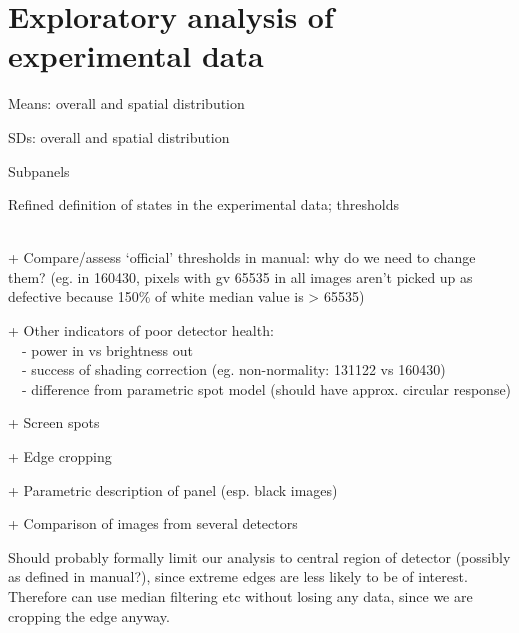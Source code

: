 \documentclass[\main/IO-Pixels.tex]{subfiles}
\begin{document}
\section{Exploratory analysis of experimental data}
\begin{outline}
Means: overall and spatial distribution

SDs: overall and spatial distribution

Subpanels

Refined definition of states in the experimental data; thresholds

\\
+ Compare/assess `official' thresholds in manual: why do we need to change them? (eg. in 160430, pixels with gv 65535 in all images aren't picked up as defective because 150\% of white median value is > 65535) 

+ Other indicators of poor detector health: \\ \-\  \-\ - power in vs brightness out \\ \-\  \-\ - success of shading correction (eg. non-normality: 131122 vs 160430) \\\-\  \-\ - difference from parametric spot model (should have approx. circular response)

+ Screen spots

+ Edge cropping

+ Parametric description of panel (esp. black images)

+ Comparison of images from several detectors


\end{outline}

Should probably formally limit our analysis to central region of detector (possibly as defined in manual?), since extreme edges are less likely to be of interest. Therefore can use median filtering etc without losing any data, since we are cropping the edge anyway.
\end{document}
